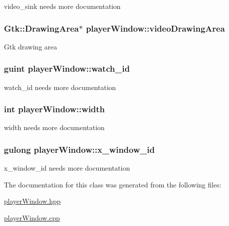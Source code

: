 video\-\_\-sink needs more documentation \hypertarget{classplayerWindow_a86cf18b2dd54a8b7c48d012134dc2947}{
\subsubsection[{video\-Drawing\-Area}]{\setlength{\rightskip}{0pt plus 5cm}Gtk\-::\-Drawing\-Area$\ast$ player\-Window\-::video\-Drawing\-Area\hspace{0.3cm}{\ttfamily [protected]}}}\label{classplayerWindow_a86cf18b2dd54a8b7c48d012134dc2947}
Gtk drawing area \hypertarget{classplayerWindow_a833e506ec550999787f9f7e93230db05}{
\subsubsection[{watch\-\_\-id}]{\setlength{\rightskip}{0pt plus 5cm}guint player\-Window\-::watch\-\_\-id\hspace{0.3cm}{\ttfamily [protected]}}}\label{classplayerWindow_a833e506ec550999787f9f7e93230db05}
watch\-\_\-id needs more documentation \hypertarget{classplayerWindow_a79e2533cebccc83d98d2067b8460955e}{
\subsubsection[{width}]{\setlength{\rightskip}{0pt plus 5cm}int player\-Window\-::width\hspace{0.3cm}{\ttfamily [protected]}}}\label{classplayerWindow_a79e2533cebccc83d98d2067b8460955e}
width needs more documentation \hypertarget{classplayerWindow_a4321bc0e5325c15b4a11267d5efc2482}{
\subsubsection[{x\-\_\-window\-\_\-id}]{\setlength{\rightskip}{0pt plus 5cm}gulong player\-Window\-::x\-\_\-window\-\_\-id\hspace{0.3cm}{\ttfamily [protected]}}}\label{classplayerWindow_a4321bc0e5325c15b4a11267d5efc2482}
x\-\_\-window\-\_\-id needs more documentation 

The documentation for this class was generated from the following files\-:\begin{DoxyCompactItemize}
\item 
\hyperlink{playerWindow_8hpp}{player\-Window.\-hpp}\item 
\hyperlink{playerWindow_8cpp}{player\-Window.\-cpp}\end{DoxyCompactItemize}
